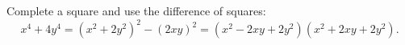 Complete a square and use the difference of squares:\[x^4+4y^4=(x^2+2y^2)^2-(2xy)^2=\boxed{(x^2-2xy+2y^2)(x^2+2xy+2y^2)}.\]
